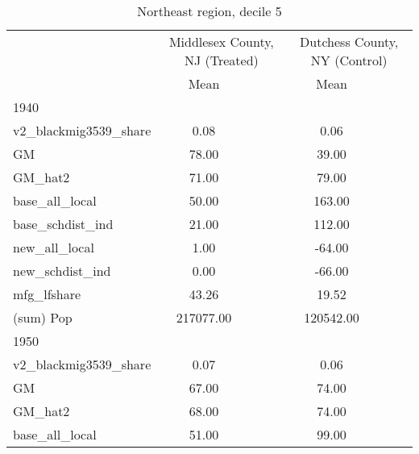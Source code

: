 \begin{table}[htbp]\centering
\def\sym#1{\ifmmode^{#1}\else\(^{#1}\)\fi}
\caption{Northeast region, decile 5 \label{tab1}}
\begin{tabular}{l*{2}{ccc}}
\toprule
                    &\multicolumn{3}{c}{Middlesex County, NJ (Treated)}&\multicolumn{3}{c}{Dutchess County, NY (Control)}\\
                    &        Mean&            &            &        Mean&            &            \\
\midrule
1940                &            &            &            &            &            &            \\
v2\_blackmig3539\_share&        0.08&            &            &        0.06&            &            \\
GM                  &       78.00&            &            &       39.00&            &            \\
GM\_hat2             &       71.00&            &            &       79.00&            &            \\
base\_all\_local      &       50.00&            &            &      163.00&            &            \\
base\_schdist\_ind    &       21.00&            &            &      112.00&            &            \\
new\_all\_local       &        1.00&            &            &      -64.00&            &            \\
new\_schdist\_ind     &        0.00&            &            &      -66.00&            &            \\
mfg\_lfshare         &       43.26&            &            &       19.52&            &            \\
(sum) Pop           &   217077.00&            &            &   120542.00&            &            \\
\midrule
1950                &            &            &            &            &            &            \\
v2\_blackmig3539\_share&        0.07&            &            &        0.06&            &            \\
GM                  &       67.00&            &            &       74.00&            &            \\
GM\_hat2             &       68.00&            &            &       74.00&            &            \\
base\_all\_local      &       51.00&            &            &       99.00&            &            \\

\end{tabular}
\end{table}
